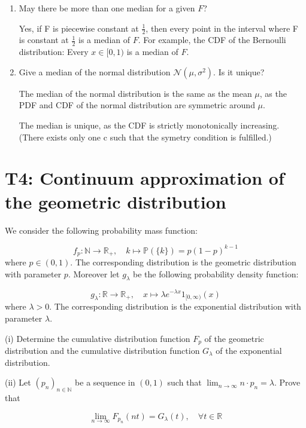 \documentclass[12pt]{article}
\begin{document}
\begin{enumerate}
\begin{enumerate}
\item May there be more than one median for a given $F$?

Yes, if F is piecewise constant at $\frac{1}{2}$, then every point in the interval where F is constant at $\frac{1}{2}$ is a median of $F$.
For example, the CDF of the Bernoulli distribution: Every $x \in [0,1)$ is a median of $F$.


\item Give a median of the normal distribution $\mathcal{N}\left(\mu, \sigma^{2}\right)$. Is it unique?

The median of the normal distribution is the same as the mean $\mu$, as  the PDF and CDF of the normal distribution are symmetric around $\mu$.

The median is unique, as the CDF is strictly monotonically increasing. (There exists only one c such that the symetry condition is fulfilled.)
\end{enumerate}

\end{enumerate}

\section*{T4: Continuum approximation of the geometric distribution}

We consider the following probability mass function:

\[
f_{p}: \mathbb{N} \rightarrow \mathbb{R}_{+}, \quad k \mapsto \mathbb{P}(\{k\})=p(1-p)^{k-1}
\]
where $p \in(0,1)$. The corresponding distribution is the geometric distribution with parameter $p$. Moreover let $g_{\lambda}$ be the following probability density function:

$$
g_{\lambda}: \mathbb{R} \rightarrow \mathbb{R}_{+}, \quad x \mapsto \lambda e^{-\lambda x} 1_{[0, \infty)}(x)
$$
where $\lambda>0$. The corresponding distribution is the exponential distribution with parameter $\lambda$.

(i) Determine the cumulative distribution function $F_{p}$ of the geometric distribution and the cumulative distribution function $G_{\lambda}$ of the exponential distribution.

(ii) Let $\left(p_{n}\right)_{n \in \mathbb{N}}$ be a sequence in $(0,1)$ such that $\lim _{n \rightarrow \infty} n \cdot p_{n}=\lambda$. Prove that

$$
\lim _{n \rightarrow \infty} F_{p_{n}}(n t)=G_{\lambda}(t), \quad \forall t \in \mathbb{R}
$$
\end{document}
